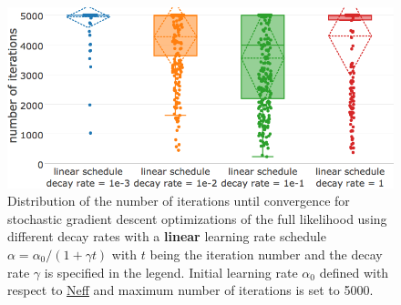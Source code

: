 \documentclass[11pt,a4paper,twoside]{book}
\theoremstyle{definition}
\theoremstyle{definition}
\theoremstyle{remark}
\begin{document}
\begin{figure}

{\centering \includegraphics[width=0.9\linewidth]{img/full_likelihood/appendix/distribution_numiterations_against_linear_learningrate_schedule} 

}

\caption{Distribution of the
number of iterations until convergence for stochastic gradient descent
optimizations of the full likelihood using different decay rates with a
\textbf{linear} learning rate schedule
\(\alpha = \alpha_0 / (1 + \gamma t)\) with \(t\) being the iteration
number and the decay rate \(\gamma\) is specified in the legend. Initial
learning rate \(\alpha_0\) defined with respect to
\protect\hyperlink{abbrev}{Neff} and maximum number of iterations is set
to 5000.}\label{fig:cd-numit-lin-learning-rate-schedule}
\end{figure}
\end{document}
